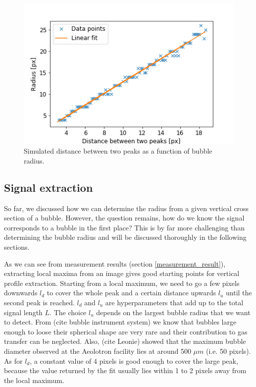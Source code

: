 		\begin{figure}
			\centering
			\includegraphics[scale=.7]{graphs/peak_distance_radius_fit.png}
			\caption{Simulated distance between two peaks as a function of bubble radius.}
			\label{fig:peaks_radius_fit}
		\end{figure}
	
	
	
	\subsection{Signal extraction}
		So far, we discussed how we can determine the radius from a given vertical cross section of a bubble. However, the question remains, how do we know the signal corresponds to a bubble in the first place? This is by far more challenging than determining the bubble radius and will be discussed thoroughly in the following sections. 
		
		As we can see from measurement results (section \ref{measurement_result}), extracting local maxima from an image gives good starting points for vertical profile extraction. Starting from a local maximum, we need to go a few pixels downwards $l_{d}$ to cover the whole peak and a certain distance upwards $l_u$ until the second peak is reached. $l_d$ and $l_u$ are hyperparameters that add up to the total signal length $L$. The choice $l_u$ depends on the largest bubble radius that we want to detect. From (cite bubble instrument system) we know that bubbles large enough to loose their spherical shape are very rare and their contribution to gas transfer can be neglected. Also, (cite Leonie) showed that the maximum bubble diameter observed at the Aeolotron facility lies at around 500 $\mu m$ (i.e. 50 pixels). As for $l_d$, a constant value of 4 pixels is good enough to cover the large peak, because the value returned by the fit usually lies within 1 to 2 pixels away from the local maximum. 	
	
